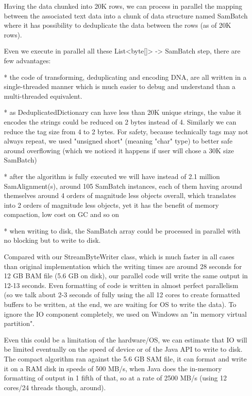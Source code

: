 \documentclass[a4paper,twoside]{article}
\begin{document}
Having the data chunked into 20K rows, we can process in parallel the mapping between the associated text data into a chunk of data structure named SamBatch where it has possibility to deduplicate the data between the rows (as of 20K rows).

Even we execute in parallel all these List<byte[]> -> SamBatch step, there are few advantages:

* the code of transforming, deduplicating and encoding DNA, are all written in a single-threaded manner which is much easier to debug and understand than a multi-threaded equivalent.

* as DeduplicatedDictionary can have less than 20K unique strings, the value it encodes the strings could be reduced on 2 bytes instead of 4. Similarly we can reduce the tag size from 4 to 2 bytes. For safety, because technically tags may not always repeat, we used "unsigned short" (meaning "char" type)
to better safe around overflowing (which we noticed it happens if user will chose a 30K size SamBatch)

* after the algorithm is fully executed we will have instead of 2.1 million SamAlignment(s), around 105 SamBatch instances, each of them having around themselves around 4 orders of magnitude less objects overall,
which translates into 2 orders of magnitude less objects, yet it has the benefit of memory compaction, low cost on GC and so on

* when writing to disk, the SamBatch array could be processed in parallel with no blocking but to write to disk.

Compared with our StreamByteWriter class, which is much faster in all cases than original implementation which the
writing times are around 28 seconds for 12 GB BAM file (5.6 GB on disk), our parallel code will write the same output in 12-13 seconds.
Even formatting of code is written in almost perfect parallelism (so we talk about 2-3 seconds of fully using the all 12 cores to create
formatted buffers to be written, at the end, we are waiting for OS to write the data). To ignore the IO component
completely, we used on Windows an "in memory virtual partition".

Even this could be a limitation of the hardware/OS, we can estimate that IO will be limited eventually on the speed
of device or of the Java API to write to disk. The compact algorithm ran against the 5.6 GB SAM file, it can format and write it
on a RAM disk in speeds of 500 MB/s, when Java does the in-memory formatting of output in 1 fifth of that, so at a rate of 2500 MB/s
(using 12 cores/24 threads though, around).
\end{document}
